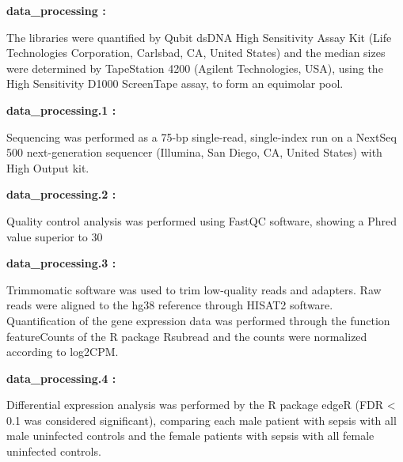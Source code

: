 \documentclass[
]{article}
\begin{document}
\begin{center}\begin{tcolorbox}[colback=gray!10, colframe=gray!50, width=0.9\linewidth, arc=1mm, boxrule=0.5pt]
\textbf{
data\_processing
:}

\vspace{0.5em}

    The libraries were quantified by Qubit dsDNA High
Sensitivity Assay Kit (Life Technologies Corporation,
Carlsbad, CA, United States) and the median sizes were
determined by TapeStation 4200 (Agilent Technologies, USA),
using the High Sensitivity D1000 ScreenTape assay, to form
an equimolar pool.

\vspace{2em}


\textbf{
data\_processing.1
:}

\vspace{0.5em}

    Sequencing was performed as a 75-bp single-read,
single-index run on a NextSeq 500 next-generation sequencer
(Illumina, San Diego, CA, United States) with High Output
kit.

\vspace{2em}


\textbf{
data\_processing.2
:}

\vspace{0.5em}

    Quality control analysis was performed using FastQC
software, showing a Phred value superior to 30

\vspace{2em}


\textbf{
data\_processing.3
:}

\vspace{0.5em}

    Trimmomatic software was used to trim low-quality reads
and adapters. Raw reads were aligned to the hg38 reference
through HISAT2 software. Quantification of the gene
expression data was performed through the function
featureCounts of the R package Rsubread and the counts were
normalized according to log2CPM.

\vspace{2em}


\textbf{
data\_processing.4
:}

\vspace{0.5em}

    Differential expression analysis was performed by the R
package edgeR (FDR < 0.1 was considered significant),
comparing each male patient with sepsis with all male
uninfected controls and the female patients with sepsis
with all female uninfected controls.


\end{tcolorbox}
\end{center}
\end{document}

